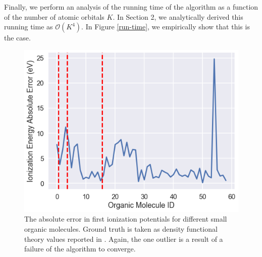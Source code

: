 \documentclass[12pt]{article}
\newcommand{\Oh}{\mathcal{O}}
\begin{document}
Finally, we perform an analysis of the running time of the algorithm as a function of the number of atomic orbitals $K$.  In Section 2, we analytically derived this running time as $\Oh(K^4)$.  In Figure \ref{run-time}, we empirically show that this is the case.     

\begin{figure}[H]
\begin{center}
\includegraphics[scale=0.5]{img/ionize-energy}
\end{center}
\caption{The absolute error in first ionization potentials for different small organic molecules.  Ground truth is taken as density functional theory values reported in \cite{montavon2013}.  Again, the one outlier is a result of a failure of the algorithm to converge.} \label{ionize-energy}
\end{figure} 
\end{document}

